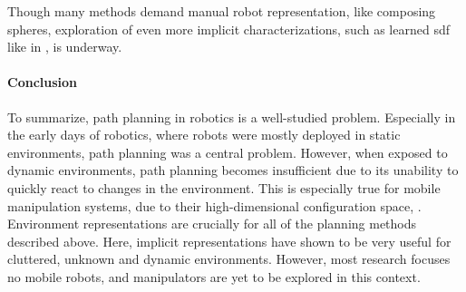 Though many methods demand manual robot representation, like
composing spheres, exploration of even more implicit
characterizations, such as learned \ac{sdf} like in
\cite{Liu2022regularized,Koptev2023neural}, is underway.

\paragraph{Conclusion}

To summarize, path planning in robotics is a well-studied
problem. Especially in the early days of robotics, where
robots were mostly deployed in static environments, path
planning was a central problem. However, when exposed to
dynamic environments, path planning becomes insufficient due
to its unability to quickly react to changes in the
environment. This is especially true for mobile manipulation
systems, due to their high-dimensional configuration space,
\cite{Avanzini2018}. Environment representations are
crucially for all of the planning methods described above.
Here, implicit representations have shown to be very useful
for cluttered, unknown and dynamic environments. However,
most research focuses no mobile robots, and manipulators
are yet to be explored in this context.



